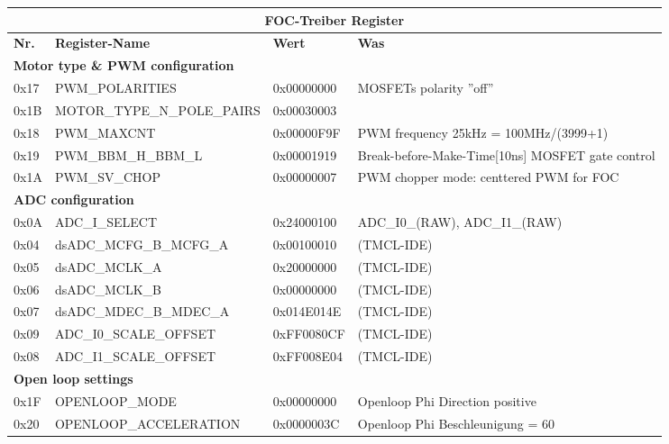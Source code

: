\begin{table}[H]
\begin{tabularx}{\textwidth}{|l|l|l|X|}
\hline
\multicolumn{4}{|c|}{\textbf{FOC-Treiber Register}}               \\ \hline
\textbf{Nr. }& \textbf{Register-Name   }   & \textbf{Wert }      & \textbf{Was} \\ \hline
\multicolumn{4}{|l|}{\textbf{Motor type \&  PWM configuration}}        \\ \hline
0x17         & PWM\_POLARITIES             & 0x00000000 & MOSFETs polarity ''off''    \\ \hline
0x1B         & MOTOR\_TYPE\_N\_POLE\_PAIRS & 0x00030003 &     \\ \hline
0x18         & PWM\_MAXCNT                 & 0x00000F9F & PWM frequency 25kHz = 100MHz/(3999+1)   \\ \hline
0x19         & PWM\_BBM\_H\_BBM\_L         & 0x00001919 & Break-before-Make-Time[10ns] MOSFET gate control \\ \hline
0x1A         & PWM\_SV\_CHOP               & 0x00000007 & PWM chopper mode: centtered PWM for FOC \\ \hline
\multicolumn{4}{|l|}{\textbf{ADC configuration}}                       \\ \hline
0x0A         & ADC\_I\_SELECT              & 0x24000100 & ADC\_I0\_(RAW), ADC\_I1\_(RAW)    \\ \hline
0x04         & dsADC\_MCFG\_B\_MCFG\_A     & 0x00100010 & (TMCL-IDE)    \\ \hline
0x05         & dsADC\_MCLK\_A              & 0x20000000 & (TMCL-IDE)    \\ \hline
0x06         & dsADC\_MCLK\_B              & 0x00000000 & (TMCL-IDE)    \\ \hline
0x07         & dsADC\_MDEC\_B\_MDEC\_A     & 0x014E014E & (TMCL-IDE)    \\ \hline
0x09         & ADC\_I0\_SCALE\_OFFSET      & 0xFF0080CF & (TMCL-IDE)    \\ \hline
0x08         & ADC\_I1\_SCALE\_OFFSET      & 0xFF008E04 & (TMCL-IDE)    \\ \hline
\multicolumn{4}{|l|}{\textbf{Open loop settings}}                      \\ \hline
0x1F         & OPENLOOP\_MODE              & 0x00000000 & Openloop Phi Direction positive    \\ \hline
0x20         & OPENLOOP\_ACCELERATION      & 0x0000003C & Openloop Phi Beschleunigung = 60    \\ \hline

\end{tabularx}
\end{table}
